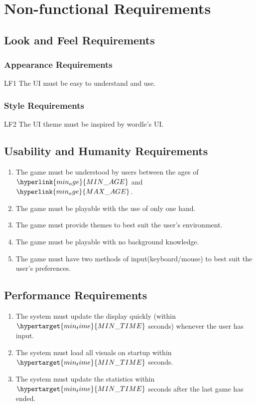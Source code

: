 \documentclass[12pt, titlepage]{article}
\begin{document}
	\section{Non-functional Requirements}
	
	\subsection{Look and Feel Requirements}
	\subsubsection{Appearance Requirements}
	LF1 The UI must be easy to understand and use.
	\subsubsection{Style Requirements}
	LF2 The UI theme must be inspired by wordle's UI.
	
	\subsection{Usability and Humanity Requirements}
	\begin{enumerate}[label=UH\arabic*]
		\item The game must be understood by users between the ages of 
		$\hyperlink{min_age}{MIN\_AGE}$ and $\hyperlink{min_age}{MAX\_AGE}$.
		\item The game must be playable with the use of only one hand.
		\item The game must provide themes to best suit the user's environment.
		\item The game must be playable with no background knowledge.
		\item The game must have two methods of input(keyboard/mouse) to best 
		suit 
		the user's preferences.
	\end{enumerate}
	
	\subsection{Performance Requirements}
	\begin{enumerate}[label=P\arabic*]
		\item The system must update the display quickly (within 
		$\hypertarget{min_time}{MIN\_TIME}$ seconds) 
		whenever the user has input.
		\item The system must load all visuals on startup within 
		$\hypertarget{min_time}{MIN\_TIME}$ seconds. 
		\item The system must update the statistics within 
		$\hypertarget{min_time}{MIN\_TIME}$ seconds after the 
		last 
		game has ended. 
	\end{enumerate}
	
\end{document}
